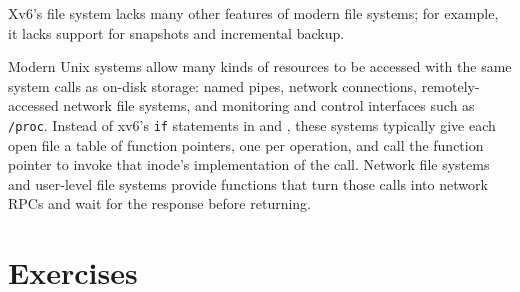 Xv6's file system lacks many other features of modern file systems; for example,
it lacks support for snapshots and incremental backup.

Modern Unix systems allow many kinds of resources to be
accessed with the same system calls as on-disk storage:
named pipes, network connections,
remotely-accessed network file systems, and monitoring and control
interfaces such as
\lstinline{/proc}.
Instead of xv6's
\lstinline{if}
statements in
and
,
these systems typically give each open file a table of function pointers,
one per operation,
and call the function pointer to invoke that inode's
implementation of the call.
Network file systems and user-level file systems 
provide functions that turn those calls into network RPCs
and wait for the response before returning.
\section{Exercises}

